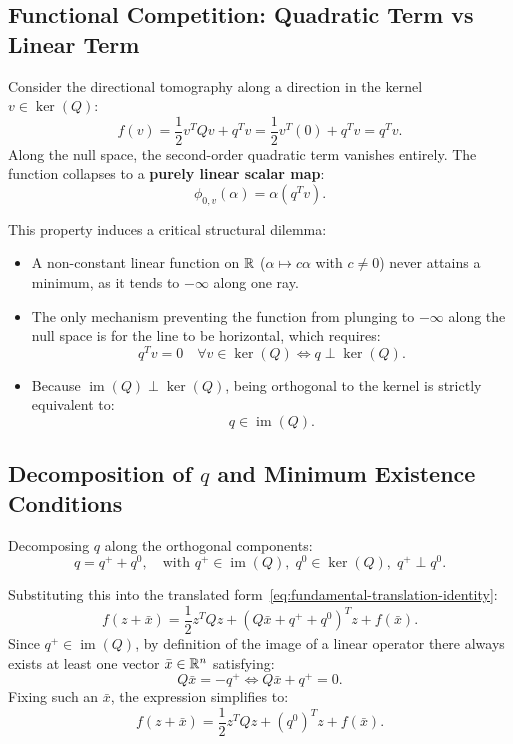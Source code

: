 \subsection{Functional Competition: Quadratic Term vs Linear Term}
Consider the directional tomography along a direction in the kernel $v \in \ker(Q)$:
\begin{equation}
    f(v) = \frac{1}{2} v^T Q v + q^T v = \frac{1}{2} v^T (0) + q^T v = q^T v.
\end{equation}
Along the null space, the second-order quadratic term vanishes entirely. The function collapses to a \textbf{purely linear scalar map}:
\begin{equation}
    \phi_{0, v}(\alpha) = \alpha (q^T v).
\end{equation}

This property induces a critical structural dilemma:
\begin{itemize}
    \item A non-constant linear function on $\mathbb{R}$ ($\alpha \mapsto c\alpha$ with $c \neq 0$) never attains a minimum, as it tends to $-\infty$ along one ray.
    \item The only mechanism preventing the function from plunging to $-\infty$ along the null space is for the line to be horizontal, which requires:
    \begin{equation}
        q^T v = 0 \quad \forall v \in \ker(Q) \iff q \perp \ker(Q).
    \end{equation}
    \item Because $\operatorname{im}(Q) \perp \ker(Q)$, being orthogonal to the kernel is strictly equivalent to:
    \begin{equation}
        q \in \operatorname{im}(Q).
    \end{equation}
\end{itemize}

\subsection{Decomposition of \texorpdfstring{$q$}{q} and Minimum Existence Conditions}
Decomposing $q$ along the orthogonal components:
\begin{equation}
    q = q^+ + q^0, \quad \text{with } q^+ \in \operatorname{im}(Q), \; q^0 \in \ker(Q), \; q^+ \perp q^0.
\end{equation}

Substituting this into the translated form~\eqref{eq:fundamental-translation-identity}:
\begin{equation}
    f(z + \bar{x}) = \frac{1}{2} z^T Q z + (Q \bar{x} + q^+ + q^0)^T z + f(\bar{x}).
\end{equation}
Since $q^+ \in \operatorname{im}(Q)$, by definition of the image of a linear operator there always exists at least one vector $\bar{x} \in \mathbb{R}^n$ satisfying:
\begin{equation}
    Q \bar{x} = -q^+ \iff Q \bar{x} + q^+ = 0.
\end{equation}
Fixing such an $\bar{x}$, the expression simplifies to:
\begin{equation}
    f(z + \bar{x}) = \frac{1}{2} z^T Q z + (q^0)^T z + f(\bar{x}).
    \label{eq:reduced-singular-form-en}
\end{equation}


